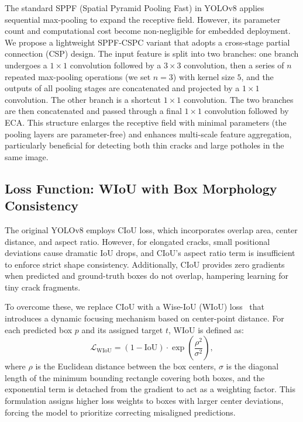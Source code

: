 \documentclass{ieeeaccess}
\begin{document}
{The standard SPPF (Spatial Pyramid Pooling Fast) in YOLOv8 applies sequential max-pooling to expand the receptive field. However, its parameter count and computational cost become non-negligible for embedded deployment. We propose a lightweight SPPF-CSPC variant that adopts a cross-stage partial connection (CSP) design. The input feature is split into two branches: one branch undergoes a $1\times1$ convolution followed by a $3\times3$ convolution, then a series of $n$ repeated max-pooling operations (we set $n=3$) with kernel size $5$, and the outputs of all pooling stages are concatenated and projected by a $1\times1$ convolution. The other branch is a shortcut $1\times1$ convolution. The two branches are then concatenated and passed through a final $1\times1$ convolution followed by ECA. This structure enlarges the receptive field with minimal parameters (the pooling layers are parameter-free) and enhances multi-scale feature aggregation, particularly beneficial for detecting both thin cracks and large potholes in the same image.

\subsection{Loss Function: WIoU with Box Morphology Consistency}

The original YOLOv8 employs CIoU loss, which incorporates overlap area, center distance, and aspect ratio. However, for elongated cracks, small positional deviations cause dramatic IoU drops, and CIoU's aspect ratio term is insufficient to enforce strict shape consistency. Additionally, CIoU provides zero gradients when predicted and ground-truth boxes do not overlap, hampering learning for tiny crack fragments.

To overcome these, we replace CIoU with a Wise-IoU (WIoU) loss~\cite{Sui2022} that introduces a dynamic focusing mechanism based on center-point distance. For each predicted box $p$ and its assigned target $t$, WIoU is defined as:
\begin{equation}
\mathcal{L}_{\text{WIoU}} = (1 - \text{IoU}) \cdot \exp\left( \frac{\rho^2}{\sigma^2} \right),
\end{equation}
where $\rho$ is the Euclidean distance between the box centers, $\sigma$ is the diagonal length of the minimum bounding rectangle covering both boxes, and the exponential term is detached from the gradient to act as a weighting factor. This formulation assigns higher loss weights to boxes with larger center deviations, forcing the model to prioritize correcting misaligned predictions.

}
\end{document}
